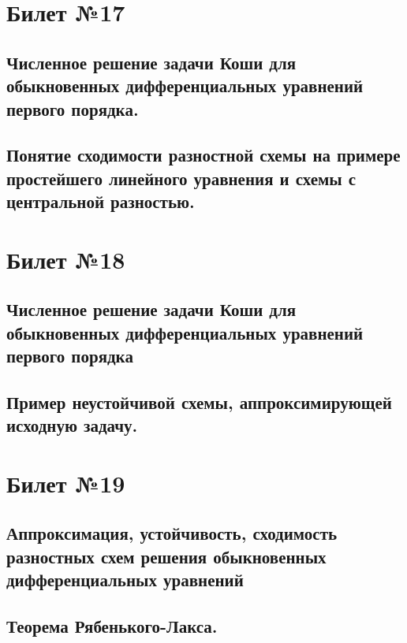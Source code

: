 \documentclass[a4paper]{article}
\begin{document}
\section{Билет №17}
\subsection{Численное решение задачи Коши для обыкновенных дифференциальных уравнений первого порядка.}
\subsection{Понятие сходимости разностной схемы на примере простейшего линейного уравнения и схемы с центральной разностью.}

\section{Билет №18}
\subsection{Численное решение задачи Коши для обыкновенных дифференциальных уравнений первого порядка}
\subsection{Пример неустойчивой схемы, аппроксимирующей исходную задачу.}

\section{Билет №19}
\subsection{Аппроксимация, устойчивость, сходимость разностных схем решения обыкновенных дифференциальных уравнений}
\subsection{Теорема Рябенького-Лакса.}
\end{document}
